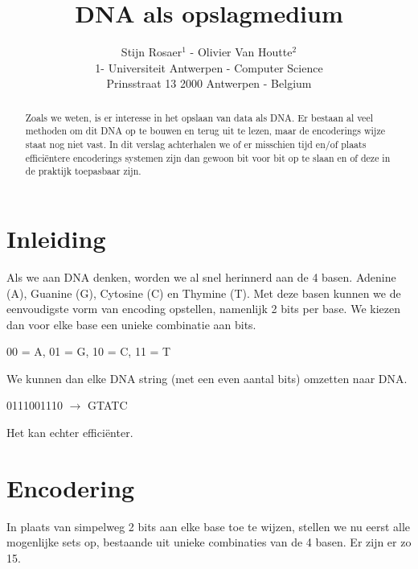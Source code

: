 \documentclass{esannV2}
\begin{document}
\title{DNA als opslagmedium}

\author{Stijn Rosaer$^1$ - Olivier Van Houtte$^2$
\vspace{.3cm}\\
1- Universiteit Antwerpen - Computer Science \\
Prinsstraat 13 2000 Antwerpen - Belgium
}
\maketitle

\begin{abstract}
Zoals we weten, is er interesse in het opslaan van data als DNA. Er bestaan al veel methoden om dit DNA op te bouwen en terug uit te lezen, maar de encoderings wijze staat nog niet vast. In dit verslag achterhalen we of er misschien tijd en/of plaats effici\"entere encoderings systemen zijn dan gewoon bit voor bit op te slaan en of deze in de praktijk toepasbaar zijn. 
\end{abstract}

\section{Inleiding}
Als we aan DNA denken, worden we al snel herinnerd aan de 4 basen. Adenine (A), Guanine (G), Cytosine (C) en Thymine (T). Met deze basen kunnen we de eenvoudigste vorm van encoding opstellen, namenlijk 2 bits per base. We kiezen dan voor elke base een unieke combinatie aan bits.
\newline

00 = A, 01 = G, 10 = C, 11 = T
\newline


We kunnen dan elke DNA string (met een even aantal bits) omzetten naar DNA.
\newline

0111001110 $\rightarrow$ GTATC
\newline

Het kan echter effici\"enter. 


\section{Encodering}

In plaats van simpelweg 2 bits aan elke base toe te wijzen, stellen we nu eerst alle mogenlijke sets op, bestaande uit unieke combinaties van de 4 basen. Er zijn er zo 15.
\end{document}
